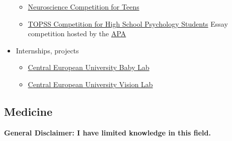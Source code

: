 \documentclass{article}
\begin{document}
\begin{itemize}
\begin{itemize}
       \item \href{https://thebrainbee.org/}{Neuroscience Competition for Teens}
       \item \href{https://www.apa.org/ed/precollege/topss/student-competition}{TOPSS Competition for High School Psychology Students} Essay competition hosted by the \href{https://www.apa.org/}{APA}
   \end{itemize}
    \item Internships, projects
    \begin{itemize}
        \item \href{https://cognitivescience.ceu.edu/unit/baby-lab}{Central European University Baby Lab}
        \item \href{https://www.visionlab-ceu.org/}{Central European University Vision Lab}
    \end{itemize}
\end{itemize}

\subsection{Medicine}
\textbf{General Disclaimer: I have limited knowledge in this field.}
\end{document}
